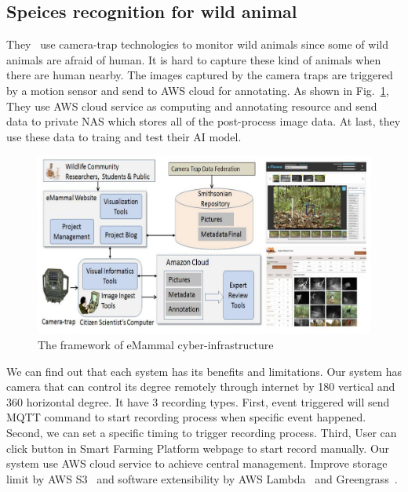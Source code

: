 \subsection{Speices recognition for wild animal}
They~\cite{wildlife-paper} use camera-trap technologies to monitor wild animals since some of wild animals are afraid of human. It is hard to capture these kind of animals when there are human nearby. The images captured by the camera traps are triggered by a motion sensor and send to AWS cloud for annotating. As shown in Fig.~\ref{fig:wild-animal-paper-1}, They use AWS cloud service as computing and annotating resource and send data to private NAS  which stores all of the post-process image data. At last, they use these data to traing and test their AI model.

\begin{figure}[H]
    \centering
    \includegraphics[width=\textwidth]{figsrc/wild-animal-paper-1.png}
    \caption{The framework of eMammal cyber-infrastructure\label{fig:wild-animal-paper-1}}
\end{figure}


We can find out that each system has its benefits and limitations. Our system has camera that can control its degree remotely through internet by 180 vertical and 360 horizontal degree. It have 3 recording types. First, event triggered will send MQTT command to start recording process when specific event happened. Second, we can set a specific timing to trigger recording process. Third, User can click button in Smart Farming Platform webpage to start record manually. Our system use AWS cloud service to achieve central management. Improve storage limit by AWS S3~\cite{aws-s3} and software extensibility by AWS Lambda~\cite{aws-lambda} and Greengrass~\cite{aws-greengrass}.

